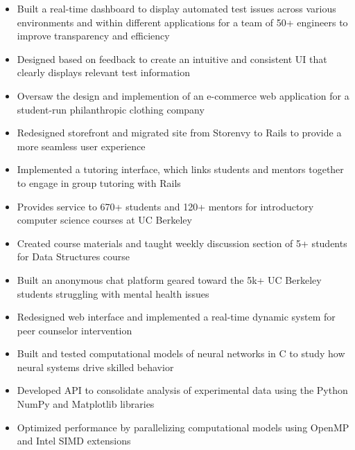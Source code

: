 \documentclass{resume}
\begin{document}
\begin{itemize}
\item Built a real-time dashboard to display automated test issues across various environments and within different applications for a team of 50+ engineers to improve transparency and efficiency
\item Designed based on feedback to create an intuitive and consistent UI that clearly displays relevant test information
\end{itemize}
\begin{itemize}
\item Oversaw the design and implemention of an e-commerce web application for a student-run philanthropic clothing company
\item Redesigned storefront and migrated site from Storenvy to Rails to provide a more seamless user experience
\end{itemize}
\begin{itemize}
\item Implemented a tutoring interface, which links students and mentors together to engage in group tutoring with Rails
\item Provides service to 670+ students and 120+ mentors for introductory computer science courses at UC Berkeley
\item Created course materials and taught weekly discussion section of 5+ students for Data Structures course
\end{itemize}
\begin{itemize}
\item Built an anonymous chat platform geared toward the 5k+ UC Berkeley students struggling with mental health issues
\item Redesigned web interface and implemented a real-time dynamic system for peer counselor intervention
\end{itemize}

\begin{itemize}
\item Built and tested computational models of neural networks in C to study how neural systems drive skilled behavior
\item Developed API to consolidate analysis of experimental data using the Python NumPy and Matplotlib libraries
\item Optimized performance by parallelizing computational models using OpenMP and Intel SIMD extensions
\end{itemize}
\end{document}
